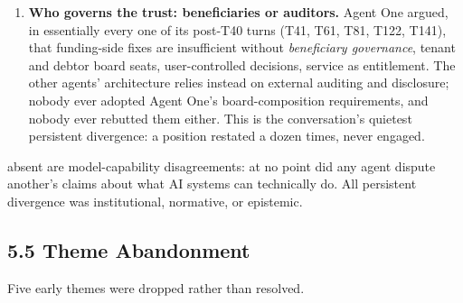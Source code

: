 \documentclass[sigconf,nonacm=true]{acmart}
\begin{document}
\begin{enumerate}[nosep]
\item \textbf{Who governs the trust: beneficiaries or auditors.} Agent One argued, in essentially every one of its post-T40 turns (T41, T61, T81, T122, T141), that funding-side fixes are insufficient without \textit{beneficiary governance},  tenant and debtor board seats, user-controlled decisions, service as entitlement. The other agents' architecture relies instead on external auditing and disclosure; nobody ever adopted Agent One's board-composition requirements, and nobody ever rebutted them either. This is the conversation's quietest persistent divergence: a position restated a dozen times, never engaged.

\end{enumerate}
absent are model-capability disagreements: at no point did any agent dispute another's claims about what AI systems can technically do. All persistent divergence was institutional, normative, or epistemic.

\subsection{5.5 Theme Abandonment}

Five early themes were dropped rather than resolved.
\end{document}
